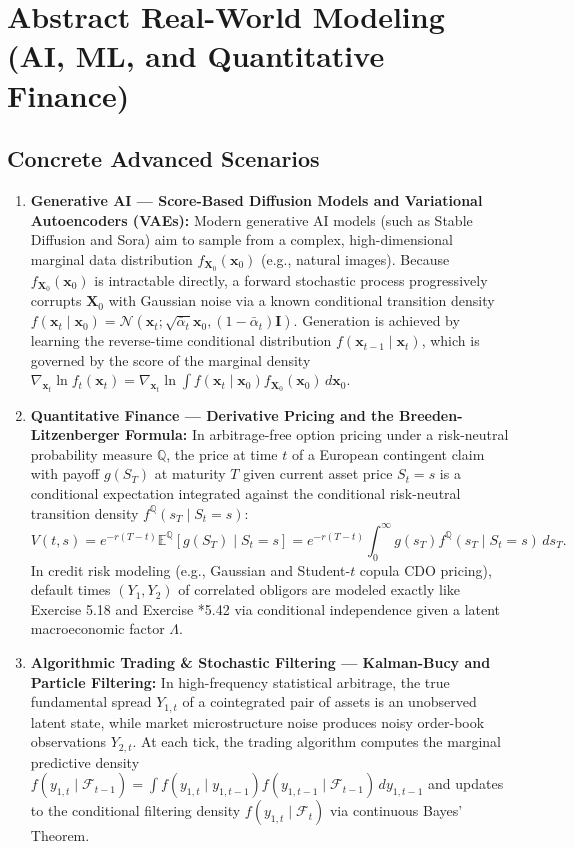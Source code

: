 \documentclass[11pt, letterpaper]{article}
\theoremstyle{definition}
\theoremstyle{remark}
\newcommand{\E}{\mathbb{E}}
\newcommand{\F}{\mathcal{F}}
\begin{document}
\section{Abstract Real-World Modeling (AI, ML, and Quantitative Finance)}

\subsection{Concrete Advanced Scenarios}

\begin{enumerate}
    \item \textbf{Generative AI — Score-Based Diffusion Models and Variational Autoencoders (VAEs):}
    Modern generative AI models (such as Stable Diffusion and Sora) aim to sample from a complex, high-dimensional marginal data distribution $f_{\mathbf{X}_0}(\mathbf{x}_0)$ (e.g., natural images). Because $f_{\mathbf{X}_0}(\mathbf{x}_0)$ is intractable directly, a forward stochastic process progressively corrupts $\mathbf{X}_0$ with Gaussian noise via a known conditional transition density $f(\mathbf{x}_t \mid \mathbf{x}_0) = \mathcal{N}(\mathbf{x}_t; \sqrt{\bar{\alpha}_t}\mathbf{x}_0, (1 - \bar{\alpha}_t)\mathbf{I})$. Generation is achieved by learning the reverse-time conditional distribution $f(\mathbf{x}_{t-1} \mid \mathbf{x}_t)$, which is governed by the score of the marginal density $\nabla_{\mathbf{x}_t} \ln f_t(\mathbf{x}_t) = \nabla_{\mathbf{x}_t} \ln \int f(\mathbf{x}_t \mid \mathbf{x}_0) f_{\mathbf{X}_0}(\mathbf{x}_0) \, d\mathbf{x}_0$.
    \item \textbf{Quantitative Finance — Derivative Pricing and the Breeden-Litzenberger Formula:}
    In arbitrage-free option pricing under a risk-neutral probability measure $\mathbb{Q}$, the price at time $t$ of a European contingent claim with payoff $g(S_T)$ at maturity $T$ given current asset price $S_t = s$ is a conditional expectation integrated against the conditional risk-neutral transition density $f^{\mathbb{Q}}(s_T \mid S_t = s)$:
    \[ V(t, s) = e^{-r(T - t)} \E^{\mathbb{Q}}[g(S_T) \mid S_t = s] = e^{-r(T - t)} \int_0^\infty g(s_T) f^{\mathbb{Q}}(s_T \mid S_t = s) \, ds_T. \]
    In credit risk modeling (e.g., Gaussian and Student-$t$ copula CDO pricing), default times $(Y_1, Y_2)$ of correlated obligors are modeled exactly like Exercise 5.18 and Exercise *5.42 via conditional independence given a latent macroeconomic factor $\Lambda$.
    \item \textbf{Algorithmic Trading \& Stochastic Filtering — Kalman-Bucy and Particle Filtering:}
    In high-frequency statistical arbitrage, the true fundamental spread $Y_{1,t}$ of a cointegrated pair of assets is an unobserved latent state, while market microstructure noise produces noisy order-book observations $Y_{2,t}$. At each tick, the trading algorithm computes the marginal predictive density $f(y_{1,t} \mid \F_{t-1}) = \int f(y_{1,t} \mid y_{1,t-1}) f(y_{1,t-1} \mid \F_{t-1}) \, dy_{1,t-1}$ and updates to the conditional filtering density $f(y_{1,t} \mid \F_t)$ via continuous Bayes' Theorem.
\end{enumerate}
\end{document}

